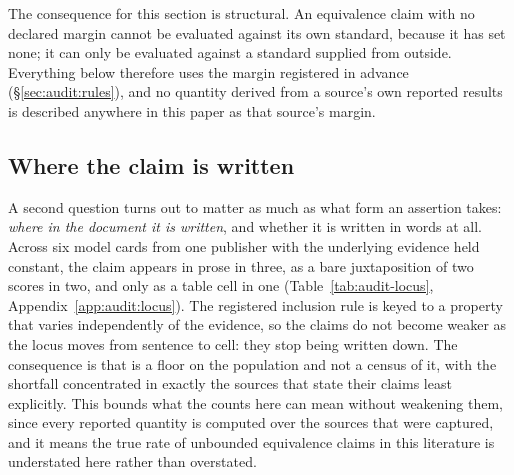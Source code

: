 The consequence for this section is structural. An equivalence claim with no
declared margin cannot be evaluated against its own standard, because it has
set none; it can only be evaluated against a standard supplied from outside.
Everything below therefore uses the margin registered in advance
(\S\ref{sec:audit:rules}), and no quantity derived from a source's own reported
results is described anywhere in this paper as that source's margin.

\subsection{Where the claim is written}
\label{sec:audit:locus}

A second question turns out to matter as much as what form an assertion takes:
\emph{where in the document it is written}, and whether it is written in words at
all. Across six model cards from one publisher with the underlying evidence held
constant, the claim appears in prose in three, as a bare juxtaposition of two
scores in two, and only as a table cell in one
(Table~\ref{tab:audit-locus}, Appendix~\ref{app:audit:locus}). The registered
inclusion rule is keyed to a property that varies independently of the evidence,
so the claims do not become weaker as the locus moves from sentence to cell:
they stop being written down. The consequence is that
\AuditFrozenCandidates{} is a floor on the population and not a census of it,
with the shortfall concentrated in exactly the sources that state their claims
least explicitly. This bounds what the counts here can mean without weakening
them, since every reported quantity is computed over the sources that were
captured, and it means the true rate of unbounded equivalence claims in this
literature is understated here rather than overstated.

